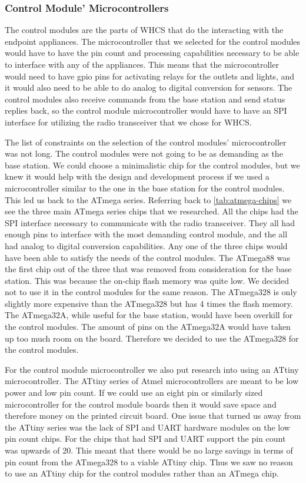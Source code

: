 \subsubsection{Control Module' Microcontrollers}
The control modules are the parts of WHCS that do the interacting with the
endpoint appliances. The microcontroller that we selected for the control
modules would have to have the pin count and processing capabilities necessary
to be able to interface with any of the appliances. This means that the
microcontroller would need to have gpio pins for activating relays for the
outlets and lights, and it would also need to be able to do analog to digital
conversion for sensors. The control modules also receive commands from the base
station and send status replies back, so the control module microcontroller
would have to have an SPI interface for utilizing the radio transceiver that we
chose for WHCS.

The list of constraints on the selection of the control modules{}'
microcontroller was not long. The control modules were not going to be as
demanding as the base station. We could choose a minimalistic chip for the
control modules, but we knew it would help with the design and development
process if we used a microcontroller similar to the one in the base station for
the control modules. This led us back to the ATmega series. Referring back to
\autoref{tab:atmega-chips} we see the three main ATmega series chips that we
researched. All the chips had the SPI interface necessary to communicate with
the radio transceiver. They all had enough pins to interface with the most
demanding control module, and the all had analog to digital conversion
capabilities. Any one of the three chips would have been able to satisfy the
needs of the control modules. The ATmega88 was the first chip out of the three
that was removed from consideration for the base station. This was because the
on{}-chip flash memory was quite low. We decided not to use it in the control
modules for the same reason. The ATmega328 is only slightly more expensive than
the ATmega328 but has 4 times the flash memory. The ATmega32A, while useful for
the base station, would have been overkill for the control modules.  The amount
of pins on the ATmega32A would have taken up too much room on the board.
Therefore we decided to use the ATmega328 for the control modules.

For the control module microcontroller we also put research into using an
ATtiny microcontroller. The ATtiny series of Atmel microcontrollers are meant
to be low power and low pin count. If we could use an eight pin or similarly
sized microcontroller for the control module boards then it would save space
and therefore money on the printed circuit board. One issue that turned us away
from the ATtiny series was the lack of SPI and UART hardware modules on the low
pin count chips. For the chips that had SPI and UART support the pin count was
upwards of 20. This meant that there would be no large savings in terms of pin
count from the ATmega328 to a viable ATtiny chip. Thus we saw no reason to use
an ATtiny chip for the control modules rather than an ATmega chip.

